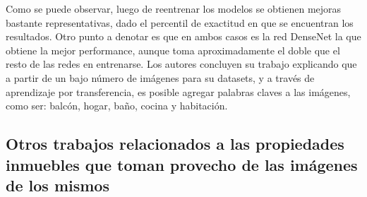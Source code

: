 Como se puede observar, luego de reentrenar los modelos se obtienen mejoras bastante representativas, dado el percentil de exactitud en que se encuentran los resultados. Otro punto a denotar es que en ambos casos es la red DenseNet la que obtiene la mejor performance, aunque toma aproximadamente el doble que el resto de las redes en entrenarse.
Los autores concluyen su trabajo explicando que a partir de un bajo número de imágenes para su datasets, y a través de aprendizaje por transferencia, es posible agregar palabras claves a las imágenes, como ser: balcón, hogar, baño, cocina y habitación.

\subsection{Otros trabajos relacionados a las propiedades inmuebles que toman provecho de las imágenes de los mismos}

